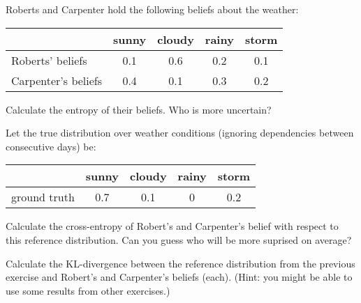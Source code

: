 \documentclass[nobib,nofonts]{tufte-handout}
\begin{document}
\bigskip
\noindent \colorbox{mygray}{\centering
  \begin{minipage}{1.0\textwidth}


    \begin{exercise}
      Roberts and Carpenter hold the following beliefs about the weather:

      \begin{center}
        \begin{tabular}{lcccc}
                              & sunny & cloudy & rainy & storm \\ \midrule
          Roberts' beliefs     & 0.1   & 0.6    & 0.2   & 0.1 \\
          Carpenter's beliefs & 0.4   & 0.1    & 0.3   & 0.2 \\
        \end{tabular}
      \end{center}

        Calculate the entropy of their beliefs. Who is more uncertain?
    \end{exercise}

    \begin{exercise}
      Let the true distribution over weather conditions (ignoring dependencies between consecutive days) be:

      \begin{center}
        \begin{tabular}{lcccc}
                       & sunny & cloudy & rainy & storm \\ \midrule
          ground truth & 0.7   & 0.1    & 0   & 0.2 \\
        \end{tabular}
      \end{center}

      Calculate the cross-entropy of Robert's and Carpenter's belief with respect to this reference distribution.
      Can you guess who will be more suprised on average?

    \end{exercise}

    \begin{exercise}

      Calculate the KL-divergence between the reference distribution from the previous exercise and Robert's and Carpenter's beliefs (each). (Hint: you might be able to use some results from other exercises.)

    \end{exercise}


\end{minipage}}
\end{document}
